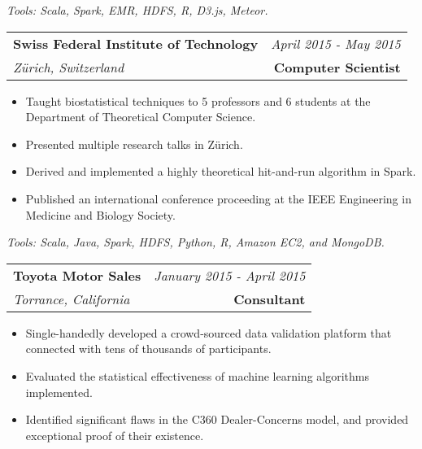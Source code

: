 \documentclass[10pt,a4paper]{article}
\begin{document}
  \vspace*{2mm}\setlength\parindent{2mm}\begin{minipage}{16.8cm}
    \textit{Tools: Scala, Spark, EMR, HDFS, R, D3.js, Meteor.}
  \end{minipage}


  \vspace*{3mm}\noindent\begin{tabularx}{17cm}{X r}
    \textbf{Swiss Federal Institute of Technology} & \textit{April 2015 - May 2015} \\
    \textit{Z{\"u}rich, Switzerland} & \textbf{Computer Scientist} \\
  \end{tabularx}

  \vspace*{1mm}\noindent\begin{minipage}{17cm}
    \begin{itemize}[leftmargin=6mm,topsep=0mm,itemsep=-1mm]
      \item Taught biostatistical techniques to 5 professors and 6 students at the Department of Theoretical Computer Science. 
      \item Presented multiple research talks in Z{\"u}rich.
      \item Derived and implemented a highly theoretical hit-and-run algorithm in Spark.
      \item Published an international conference proceeding at the IEEE Engineering in Medicine and Biology Society.
    \end{itemize}
  \end{minipage}

  \vspace*{2mm}\setlength\parindent{2mm}\begin{minipage}{16.8cm}
    \textit{Tools: Scala, Java, Spark, HDFS, Python, R, Amazon EC2, and MongoDB.}
  \end{minipage}

  \vspace*{3mm}\noindent\begin{tabularx}{17cm}{X r}
    \textbf{Toyota Motor Sales} & \textit{January 2015 - April 2015} \\
    \textit{Torrance, California} & \textbf{Consultant} \\
  \end{tabularx}

  \vspace*{1mm}\noindent\begin{minipage}{17cm}
    \begin{itemize}[leftmargin=6mm,topsep=0mm,itemsep=-1mm]
      \item Single-handedly developed a crowd-sourced data validation platform that connected with tens of thousands of participants. 
      \item Evaluated the statistical effectiveness of machine learning algorithms implemented.
      \item Identified significant flaws in the C360 Dealer-Concerns model, and provided exceptional proof of their existence.
    \end{itemize}
  \end{minipage}
\end{document}
